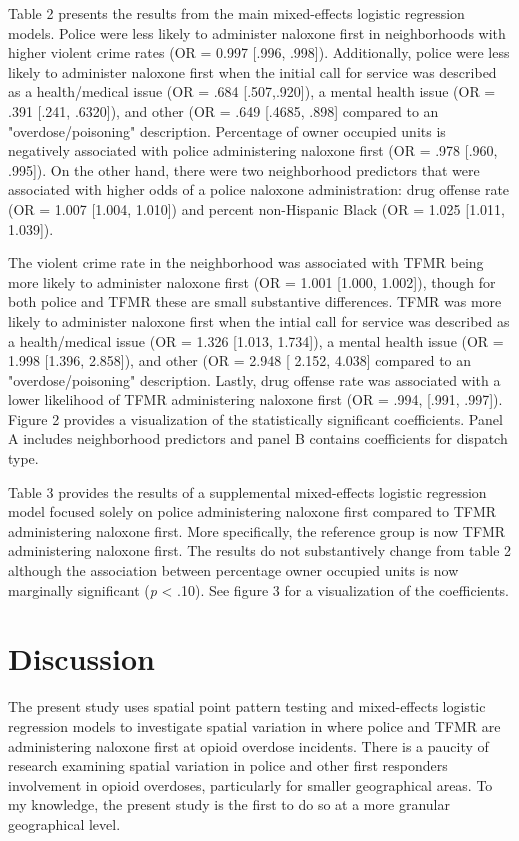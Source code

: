 Table 2 presents the results from the main mixed-effects logistic regression models. Police were less likely to administer naloxone first in neighborhoods with higher violent crime rates (OR = 0.997 [.996, .998]). Additionally, police were less likely to administer naloxone first when the initial call for service was described as a health/medical issue (OR = .684 [.507,.920]), a mental health issue (OR = .391 [.241, .6320]), and other (OR = .649 [.4685, .898] compared to an "overdose/poisoning" description. Percentage of owner occupied units is negatively associated with police administering naloxone first (OR = .978 [.960, .995]). On the other hand, there were two neighborhood predictors that were associated with higher odds of a police naloxone administration: drug offense rate (OR = 1.007 [1.004, 1.010]) and percent non-Hispanic Black (OR = 1.025 [1.011, 1.039]).

The violent crime rate in the neighborhood was associated with TFMR being more likely to administer naloxone first (OR = 1.001 [1.000, 1.002]), though for both police and TFMR these are small substantive differences. TFMR was more likely to administer naloxone first when the intial call for service was described as a health/medical issue (OR = 1.326 [1.013, 1.734]), a mental health issue (OR = 1.998 [1.396, 2.858]), and other (OR = 2.948 [ 2.152, 4.038] compared to an "overdose/poisoning" description. Lastly, drug offense rate was associated with a lower likelihood of TFMR administering naloxone first (OR = .994, [.991, .997]). Figure 2 provides a visualization of the statistically significant coefficients. Panel A includes neighborhood predictors and panel B contains coefficients for dispatch type.

Table 3 provides the results of a supplemental mixed-effects logistic regression model focused solely on police administering naloxone first compared to TFMR administering naloxone first. More specifically, the reference group is now TFMR administering naloxone first. The results do not substantively change from table 2 although the association between percentage owner occupied units is now marginally significant (\textit{p} < .10). See figure 3 for a visualization of the coefficients.

\section{\centering Discussion}
The present study uses spatial point pattern testing and mixed-effects logistic regression models to investigate spatial variation in where police and TFMR are administering naloxone first at opioid overdose incidents. There is a paucity of research examining spatial variation in police and other first responders involvement in opioid overdoses, particularly for smaller geographical areas. To my knowledge, the present study is the first to do so at a more granular geographical level. 

